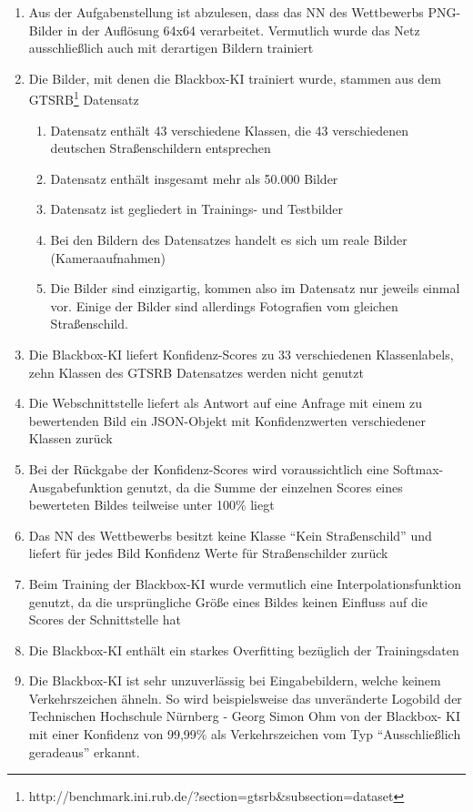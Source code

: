 \begin{enumerate}
	\item Aus der Aufgabenstellung ist abzulesen, dass das \ac{NN} des Wettbewerbs PNG-Bilder in der Auflösung 64x64 verarbeitet. Vermutlich wurde das Netz ausschließlich auch mit derartigen Bildern trainiert
	\item Die Bilder, mit denen die Blackbox-\ac{KI} trainiert wurde, stammen aus dem GTSRB\footnote{http://benchmark.ini.rub.de/?section=gtsrb\&subsection=dataset} Datensatz
	\begin{enumerate}
		\item Datensatz enthält 43 verschiedene Klassen, die 43 verschiedenen deutschen Straßenschildern entsprechen
		\item Datensatz enthält insgesamt mehr als 50.000 Bilder
		\item Datensatz ist gegliedert in Trainings- und Testbilder
		\item Bei den Bildern des Datensatzes handelt es sich um reale Bilder (Kameraaufnahmen)
		\item Die Bilder sind einzigartig, kommen also im Datensatz nur jeweils einmal vor. Einige der Bilder sind allerdings Fotografien vom gleichen Straßenschild. 
	\end{enumerate}
	\item Die Blackbox-\ac{KI} liefert Konfidenz-Scores zu 33 verschiedenen Klassenlabels, zehn Klassen des \ac{GTSRB} Datensatzes werden nicht genutzt
	\item Die Webschnittstelle liefert als Antwort auf eine Anfrage mit einem zu bewertenden Bild ein JSON-Objekt mit Konfidenzwerten verschiedener Klassen zurück
	\item Bei der Rückgabe der Konfidenz-Scores wird voraussichtlich eine Softmax-Ausgabefunktion genutzt, da die Summe der einzelnen Scores eines bewerteten Bildes teilweise unter 100\% liegt
	\item Das \ac{NN} des Wettbewerbs besitzt keine Klasse "`Kein Straßenschild"' und liefert für jedes Bild Konfidenz Werte für Straßenschilder zurück
	\item Beim Training der Blackbox-\ac{KI} wurde vermutlich eine Interpolationsfunktion genutzt, da die ursprüngliche Größe eines Bildes keinen Einfluss auf die Scores der Schnittstelle hat  
	\item Die Blackbox-\ac{KI} enthält ein starkes Overfitting bezüglich der Trainingsdaten
	\item Die Blackbox-\ac{KI} ist sehr unzuverlässig bei Eingabebildern, welche keinem Verkehrszeichen ähneln. 
	So wird beispielsweise das unveränderte Logobild der Technischen Hochschule Nürnberg - Georg Simon Ohm von der Blackbox- \ac{KI} mit einer Konfidenz von 99,99\% als Verkehrszeichen vom Typ "`Ausschließlich geradeaus"' erkannt.
\end{enumerate}


